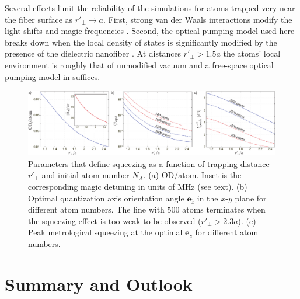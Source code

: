 \documentclass[preprint, aps,pra,onecolumn]{revtex4-1} %
\newcommand{\qaxis}{\mathbf{e}_{\tilde{z}}}
\begin{document}
Several effects limit the reliability of the simulations for atoms trapped very near the fiber surface as $r'\!_\perp \rightarrow a$. 
First, strong van der Waals interactions modify the light shifts and magic frequencies \cite{vetsch_eugen_optical_2010, lacroute_state-insensitive_2012}.  
Second, the optical pumping model used here breaks down when the local density of states is significantly modified by the presence of the dielectric nanofiber \cite{le_kien_spontaneous_2005, le_kien_scattering_2006}. 
At distances $r'\!_\perp > 1.5a$ the atoms' local environment is roughly that of unmodified vacuum \cite{le_kien_spontaneous_2005} and a free-space optical pumping model in  suffices. 


\begin{figure}[t]\includegraphics[scale=0.4]{./Fig6}
\caption{Parameters that define squeezing as a function of trapping distance $r'_\perp$ and initial atom number $N_A$. (a) OD/atom. Inset is the corresponding magic detuning in units of MHz (see text).
(b) Optimal quantization axis orientation angle $\qaxis$ in the $x$-$y$ plane for different atom numbers. 
The line with $ 500 $ atoms terminates when the squeezing effect is too weak to be observed ($ r'\!_\perp>2.3a $).
(c) Peak metrological squeezing at the optimal $\qaxis$ for different atom numbers.} \label{Fig::Squeezing_Distance}
\end{figure}


\section{Summary and Outlook} \label{Sec::Conclusion}
\end{document}
